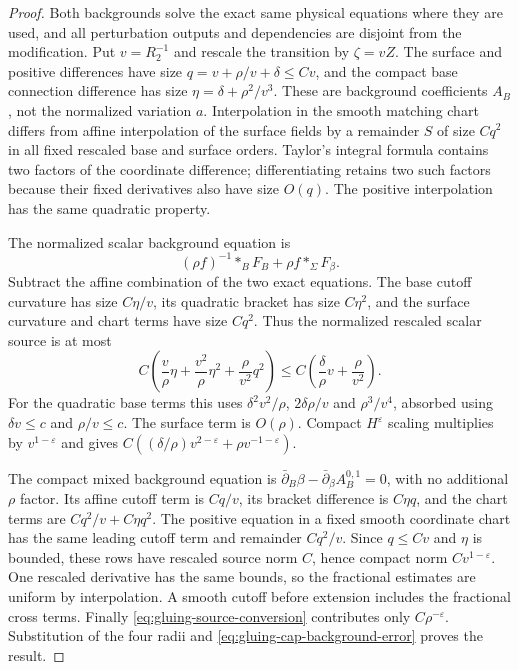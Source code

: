 \documentclass[11pt]{amsart}
\theoremstyle{definition}
\theoremstyle{remark}
\theoremstyle{plain}
\begin{document}
\begin{proof}
Both backgrounds solve the exact same physical equations where they
are used, and all perturbation outputs and dependencies are disjoint
from the modification. Put $v=R_2^{-1}$ and rescale the transition
by $\zeta=vZ$. The surface and positive differences have size
$q=v+\rho/v+\delta\leq Cv$, and the compact base connection
difference has size $\eta=\delta+\rho^2/v^3$.
These are background coefficients $A_B$, not the normalized
variation $a$. Interpolation in the smooth matching chart differs
from affine interpolation of the surface fields by a remainder
$S$ of size $Cq^2$ in all fixed rescaled base and surface orders.
Taylor's integral formula contains two factors of the coordinate
difference; differentiating retains two such factors because their
fixed derivatives also have size $O(q)$. The positive interpolation
has the same quadratic property.

The normalized scalar background equation is
\[
                    (\rho f)^{-1}*_BF_B+\rho f *_\Sigma F_\beta.
\]
Subtract the affine combination of the two exact equations. The
base cutoff curvature has size $C\eta/v$, its quadratic bracket
has size $C\eta^2$, and the surface curvature and chart terms
have size $Cq^2$. Thus the normalized rescaled scalar source is
at most
\[
 C\left(\frac v\rho\eta+\frac{v^2}\rho\eta^2
                         +\frac\rho{v^2}q^2\right)
              \leq C\left(\frac\delta\rho v+\frac\rho{v^2}\right).
\]
For the quadratic base terms this uses
$\delta^2v^2/\rho$, $2\delta\rho/v$ and $\rho^3/v^4$,
absorbed using $\delta v\leq c$ and $\rho/v\leq c$.
The surface term is $O(\rho)$. Compact $H^\varepsilon$ scaling
multiplies by $v^{1-\varepsilon}$ and gives
$C((\delta/\rho)v^{2-\varepsilon}+\rho v^{-1-\varepsilon})$.

The compact mixed background equation is
$\bar\partial_B\beta-\bar\partial_\beta A_B^{0,1}=0$,
with no additional $\rho$ factor. Its affine cutoff term is
$Cq/v$, its bracket difference is $C\eta q$, and the chart
terms are $Cq^2/v+C\eta q^2$. The positive equation in a
fixed smooth coordinate chart has the same leading cutoff term
and remainder $Cq^2/v$. Since $q\leq Cv$ and $\eta$ is
bounded, these rows have rescaled source norm $C$, hence compact
norm $Cv^{1-\varepsilon}$. One rescaled derivative has the same
bounds, so the fractional estimates are uniform by interpolation.
A smooth cutoff before extension includes the fractional cross terms.
Finally \eqref{eq:gluing-source-conversion} contributes only
$C\rho^{-\varepsilon}$. Substitution of the four radii and
\eqref{eq:gluing-cap-background-error} proves the result.
\end{proof}
\end{document}
